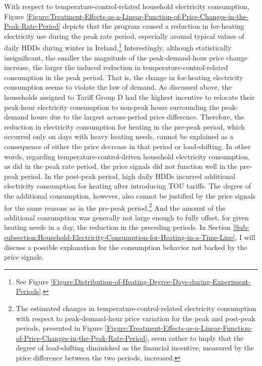 With respect to temperature-control-related household electricity consumption, Figure \ref{Figure:Treatment-Effects-as-a-Linear-Function-of-Price-Changes-in-the-Peak-Rate-Period} depicts that the program caused a reduction in for-heating electricity use during the peak rate period, especially around typical values of daily HDDs during winter in Ireland.\footnote{See Figure \ref{Figure:Distribution-of-Heating-Degree-Days-during-Experiment-Periods}.} Interestingly, although statistically insignificant, the smaller the magnitude of the peak-demand-hour price change increase, the larger the induced reduction in temperature-control-related consumption in the peak period. That is, the change in for-heating electricity consumption seems to violate the law of demand. As discussed above, the households assigned to Tariff Group D had the highest incentive to relocate their peak-hour electricity consumption to non-peak hours surrounding the peak-demand hours due to the largest across-period price difference. Therefore, the reduction in electricity consumption for heating in the pre-peak period, which occurred only on days with heavy heating needs, cannot be explained as a consequence of either the price decrease in that period or load-shifting. In other words, regarding temperature-control-driven household electricity consumption, as did in the peak rate period, the price signals did not function well in the pre-peak period. In the post-peak period, high daily HDDs incurred additional electricity consumption for heating after introducing TOU tariffs. The degree of the additional consumption, however, also cannot be justified by the price signals for the same reasons as in the pre-peak period.\footnote{The estimated changes in temperature-control-related electricity consumption with respect to peak-demand-hour price variation for the peak and post-peak periods, presented in Figure \ref{Figure:Treatment-Effects-as-a-Linear-Function-of-Price-Changes-in-the-Peak-Rate-Period}, seem rather to imply that the degree of load-shifting diminished as the financial incentive, measured by the price difference between the two periods, increased.} And the amount of the additional consumption was generally not large enough to fully offset, for given heating needs in a day, the reduction in the preceding periods. In Section \ref{Sub-subsection:Household-Electricity-Consumption-for-Heating-in-a-Time-Line}, I will discuss a possible explanation for the consumption behavior not backed by the price signals. 
